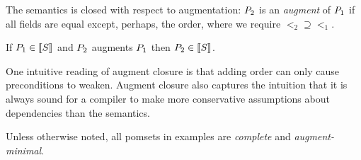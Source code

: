 The semantics is closed with respect to {augmentation:} $P_2$ is an
\emph{augment} of $P_1$ if all fields are equal except, perhaps, the
order, where we require ${\lt_2}\supseteq{\lt_1}$.  
\begin{lemma}
  If $\aPS_1\in\sembase{\aCmd}$ and $P_2$  augments $P_1$ then $\aPS_2\in\sembase{\aCmd}$.

\end{lemma}
One intuitive reading of augment closure is that adding order can only cause
preconditions to weaken.  Augment closure also captures the intuition that it
is always sound for a compiler to make more conservative assumptions about
dependencies than the semantics.

Unless otherwise noted,
all pomsets in examples are \emph{complete} and
\emph{augment-minimal}. %



